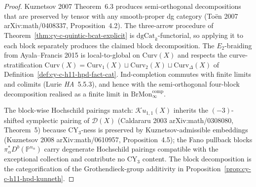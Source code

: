 \begin{proof}
Kuznetsov 2007 Theorem~6.3 produces semi-orthogonal decompositions
that are preserved by tensor with any smooth-proper dg category
(To\"en 2007 arXiv:math/0408337, Proposition~4.2). The three-arrow
procedure of Theorem~\ref{thm:cy-c-quintic-bcat-explicit} is
$\mathrm{dgCat}_k$-functorial, so applying it to each block
separately produces the claimed block decomposition. The $E_2$-braiding
from Ayala--Francis 2015 is local-to-global on
$\mathrm{Curv}(X)$ and respects the curve-stratification
$\mathrm{Curv}(X) = \mathrm{Curv}_1(X) \sqcup \mathrm{Curv}_2(X)
\sqcup \mathrm{Curv}_\Delta(X)$ of Definition~\ref{def:cy-c-h11-hpd-fact-cat}.
$\mathrm{Ind}$-completion commutes with finite limits and colimits
(Lurie \emph{HA}~5.5.3), and hence with the semi-orthogonal four-block
decomposition realised as a finite limit in
$\mathrm{BrMon}^{\mathrm{comp}}_\infty$.

The block-wise Hochschild pairings match:
$\mathcal{K}u_{1,1}(X)$ inherits the $(-3)$-shifted symplectic pairing
of $\mathcal D(X)$ (Caldararu 2003 arXiv:math/0308080, Theorem~5)
because CY$_3$-ness is preserved by Kuznetsov-admissible embeddings
(Kuznetsov 2008 arXiv:math/0610957, Proposition~4.5); the Fano
pullback blocks $\pi_\alpha^* D^b(\mathbb P^{n_\alpha})$ carry
degenerate Hochschild pairings compatible with the exceptional
collection and contribute no CY$_3$ content. The block decomposition
is the categorification of the Grothendieck-group additivity in
Proposition~\ref{prop:cy-c-h11-hpd-kunneth}.
\end{proof}

